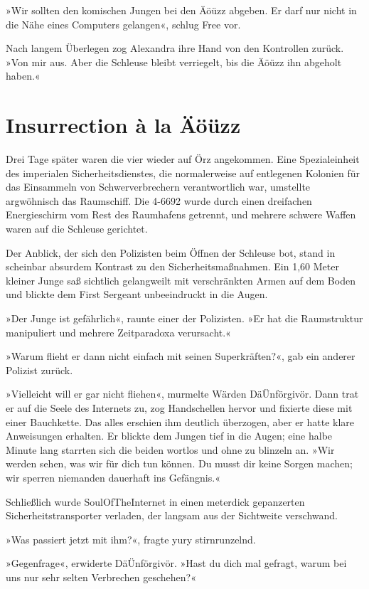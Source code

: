 »Wir sollten den komischen Jungen bei den Äöüzz abgeben. Er darf nur nicht in die Nähe eines Computers gelangen«, schlug Free vor.

Nach langem Überlegen zog Alexandra ihre Hand von den Kontrollen zurück. »Von mir aus. Aber die Schleuse bleibt verriegelt, bis die Äöüzz ihn abgeholt haben.«


\chapter{Insurrection à la Äöüzz}

Drei Tage später waren die vier wieder auf Örz angekommen. Eine Spezialeinheit des imperialen Sicherheitsdienstes, die normalerweise auf entlegenen Kolonien für das Einsammeln von Schwerverbrechern verantwortlich war, umstellte argwöhnisch das Raumschiff. Die 4-6692 wurde durch einen dreifachen Energieschirm vom Rest des Raumhafens getrennt, und mehrere schwere Waffen waren auf die Schleuse gerichtet.

Der Anblick, der sich den Polizisten beim Öffnen der Schleuse bot, stand in scheinbar absurdem Kontrast zu den Sicherheitsmaßnahmen. Ein 1,60 Meter kleiner Junge saß sichtlich gelangweilt mit verschränkten Armen auf dem Boden und blickte dem First Sergeant unbeeindruckt in die Augen.

»Der Junge ist gefährlich«, raunte einer der Polizisten. »Er hat die Raumstruktur manipuliert und mehrere Zeitparadoxa verursacht.«

»Warum flieht er dann nicht einfach mit seinen Superkräften?«, gab ein anderer Polizist zurück.

»Vielleicht will er gar nicht fliehen«, murmelte Wärden DäÜnförgivör. Dann trat er auf die Seele des Internets zu, zog Handschellen hervor und fixierte diese mit einer Bauchkette. Das alles erschien ihm deutlich überzogen, aber er hatte klare Anweisungen erhalten. Er blickte dem Jungen tief in die Augen; eine halbe Minute lang starrten sich die beiden wortlos und ohne zu blinzeln an. »Wir werden sehen, was wir für dich tun können. Du musst dir keine Sorgen machen; wir sperren niemanden dauerhaft ins Gefängnis.«

Schließlich wurde SoulOfTheInternet in einen meterdick gepanzerten Sicherheitstransporter verladen, der langsam aus der Sichtweite verschwand.

»Was passiert jetzt mit ihm?«, fragte yury stirnrunzelnd.

»Gegenfrage«, erwiderte DäÜnförgivör. »Hast du dich mal gefragt, warum bei uns nur sehr selten Verbrechen geschehen?«

